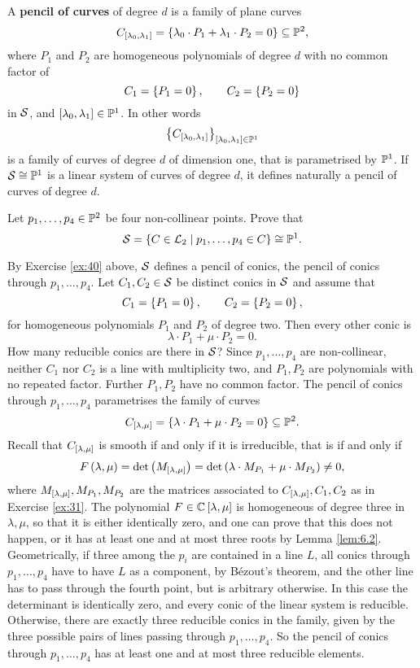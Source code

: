 \begin{definition}
A \textbf{pencil of curves} of degree $ d $ is a family of plane curves
$$ C_{\sb{\lambda_0, \lambda_1}} = \cb{\lambda_0 \cdot P_1 + \lambda_1 \cdot P_2 = 0} \subseteq \P^2, $$
where $ P_1 $ and $ P_2 $ are homogeneous polynomials of degree $ d $ with no common factor of
$$ C_1 = \cb{P_1 = 0}, \qquad C_2 = \cb{P_2 = 0} $$
in $ \SS $, and $ \sb{\lambda_0, \lambda_1} \in \P^1 $. In other words
$$ \cb{C_{\sb{\lambda_0, \lambda_1}}}_{\sb{\lambda_0, \lambda_1} \in \P^1} $$
is a family of curves of degree $ d $ of dimension one, that is parametrised by $ \P^1 $. If $ \SS \cong \P^1 $ is a linear system of curves of degree $ d $, it defines naturally a pencil of curves of degree $ d $.
\end{definition}

\pagebreak

\begin{exercise}
\label{ex:40}
Let $ p_1, \dots, p_4 \in \P^2 $ be four non-collinear points. Prove that
$$ \SS = \cb{C \in \LL_2 \mid p_1, \dots, p_4 \in C} \cong \P^1. $$
\end{exercise}

\begin{example}
By Exercise \ref{ex:40} above, $ \SS $ defines a pencil of conics, the pencil of conics through $ p_1, \dots, p_4 $. Let $ C_1, C_2 \in \SS $ be distinct conics in $ \SS $ and assume that
$$ C_1 = \cb{P_1 = 0}, \qquad C_2 = \cb{P_2 = 0}, $$
for homogeneous polynomials $ P_1 $ and $ P_2 $ of degree two. Then every other conic is
$$ \lambda \cdot P_1 + \mu \cdot P_2 = 0. $$
How many reducible conics are there in $ \SS $? Since $ p_1, \dots, p_4 $ are non-collinear, neither $ C_1 $ nor $ C_2 $ is a line with multiplicity two, and $ P_1, P_2 $ are polynomials with no repeated factor. Further $ P_1, P_2 $ have no common factor. The pencil of conics through $ p_1, \dots, p_4 $ parametrises the family of curves
$$ C_{\sb{\lambda, \mu}} = \cb{\lambda \cdot P_1 + \mu \cdot P_2 = 0} \subseteq \P^2. $$
Recall that $ C_{\sb{\lambda, \mu}} $ is smooth if and only if it is irreducible, that is if and only if
$$ F\rb{\lambda, \mu} = \det\rb{M_{\sb{\lambda, \mu}}} = \det\rb{\lambda \cdot M_{P_1} + \mu \cdot M_{P_2}} \ne 0, $$
where $ M_{\sb{\lambda, \mu}}, M_{P_1}, M_{P_2} $ are the matrices associated to $ C_{\sb{\lambda, \mu}}, C_1, C_2 $ as in Exercise \ref{ex:31}. The polynomial $ F \in \C\sb{\lambda, \mu} $ is homogeneous of degree three in $ \lambda, \mu $, so that it is either identically zero, and one can prove that this does not happen, or it has at least one and at most three roots by Lemma \ref{lem:6.2}. Geometrically, if three among the $ p_i $ are contained in a line $ L $, all conics through $ p_1, \dots, p_4 $ have to have $ L $ as a component, by B\'ezout's theorem, and the other line has to pass through the fourth point, but is arbitrary otherwise. In this case the determinant is identically zero, and every conic of the linear system is reducible. Otherwise, there are exactly three reducible conics in the family, given by the three possible pairs of lines passing through $ p_1, \dots, p_4 $. So the pencil of conics through $ p_1, \dots, p_4 $ has at least one and at most three reducible elements.
\end{example}

